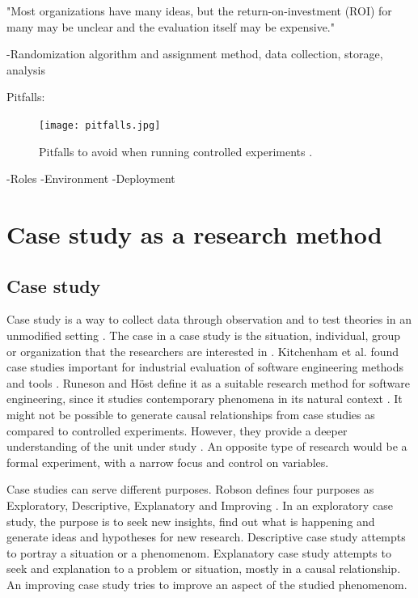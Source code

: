 \documentclass[english]{tktltiki2}
\theoremstyle{definition}
\theoremstyle{remark}
\begin{document}
"Most organizations have many ideas, but the return-on-investment (ROI) for many may be unclear and the evaluation itself may be expensive." \cite{kohavi2007practical}

-Randomization algorithm and assignment method, data collection, storage, analysis \cite{kohavi2007practical}

Pitfalls:
\begin{figure}[h]
	\centering
	\texttt{[image: pitfalls.jpg]}
	\caption{Pitfalls to avoid when running controlled experiments \cite{crook2009seven}.}
\end{figure}

-Roles
-Environment
-Deployment

\section{Case study as a research method}

\subsection{Case study}
Case study is a way to collect data through observation and to test theories in an unmodified setting \cite{zelkowitz1998experimental}. The case in a case study is the situation, individual, group or organization that the researchers are interested in \cite{robson2002real}. Kitchenham et al. found case studies important for industrial evaluation of software engineering methods and tools \cite{kitchenham1995case}. Runeson and Höst define it as a suitable research method for software engineering, since it studies contemporary phenomena in its natural context \cite{runeson2009guidelines}. It might not be possible to generate causal relationships from case studies as compared to controlled experiments. However, they provide a deeper understanding of the unit under study \cite{runeson2009guidelines}. An opposite type of research would be a formal experiment, with a narrow focus and control on variables. 

Case studies can serve different purposes. Robson defines four purposes as Exploratory, Descriptive, Explanatory and Improving \cite{robson2002real}. In an exploratory case study, the purpose is to seek new insights, find out what is happening and generate ideas and hypotheses for new research. Descriptive case study attempts to portray a situation or a phenomenom. Explanatory case study attempts to seek and explanation to a problem or situation, mostly in a causal relationship. An improving case study tries to improve an aspect of the studied phenomenom.  
\end{document}
